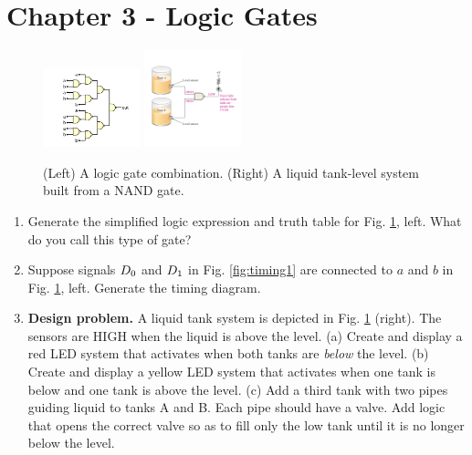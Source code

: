 \documentclass[10pt]{article}
\begin{document}
\section{Chapter 3 - Logic Gates}
\begin{figure}[ht]
\centering
\includegraphics[width=0.25\textwidth]{gateExample5.pdf}
\includegraphics[width=0.25\textwidth]{gateExample6.pdf}
\caption{\label{fig:gates1} (Left) A logic gate combination.  (Right) A liquid tank-level system built from a NAND gate.}
\end{figure}
\begin{enumerate}
\item Generate the simplified logic expression and truth table for Fig. \ref{fig:gates1}, left.  What do you call this type of gate? \\ \vspace{1.5cm}
\item Suppose signals $D_{\rm 0}$ and $D_{\rm 1}$ in Fig. \ref{fig:timing1} are connected to $a$ and $b$ in Fig. \ref{fig:gates1}, left.  Generate the timing diagram. \\ \vspace{1cm}
\item \textbf{Design problem.}  A liquid tank system is depicted in Fig. \ref{fig:gates1} (right).  The sensors are HIGH when the liquid is above the level.  (a) Create and display a red LED system that activates when both tanks are \textit{below} the level.  (b) Create and display a yellow LED system that activates when one tank is below and one tank is above the level.  (c) Add a third tank with two pipes guiding liquid to tanks A and B.  Each pipe should have a valve.  Add logic that opens the correct valve so as to fill only the low tank until it is no longer below the level.  \\ \vspace{5cm}
\end{enumerate}
\end{document}
